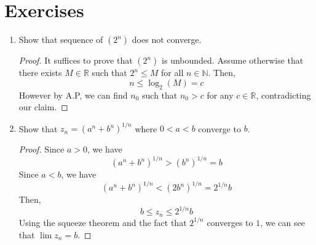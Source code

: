 \section{Exercises}
\begin{enumerate}
    \item Show that sequence of $(2^n)$ does not converge.
    \begin{proof} It suffices to prove that $(2^n)$ is unbounded. Assume otherwise that there exists $M \in \mathbb{R}$ such that $2^n \le M$ for all $n \in \mathbb{N}$. Then,
        \[ n \le \log_{2}(M) = c\]
    However by A.P, we can find $n_0$ such that $n_0 > c$ for any $c \in \mathbb{R}$, contradicting our claim.
    \end{proof}
    \item Show that $z_n = (a^n+b^n)^{1/n}$ where $0 < a < b$ converge to $b$.
    \begin{proof}
        Since $a >0$, we have
        \[ (a^n+b^n)^{1/n} > (b^n)^{1/n} = b\]
        Since $a < b$, we have
        \[ (a^n+b^n)^{1/n} < (2b^n)^{1/n} = 2^{1/n}b\]
        Then,
        \[b \le z_n \le 2^{1/n}b\]
        Using the squeeze theorem and the fact that $2^{1/n}$ converges to $1$, we can see that $\lim z_n = b$.
    \end{proof}
\end{enumerate}
